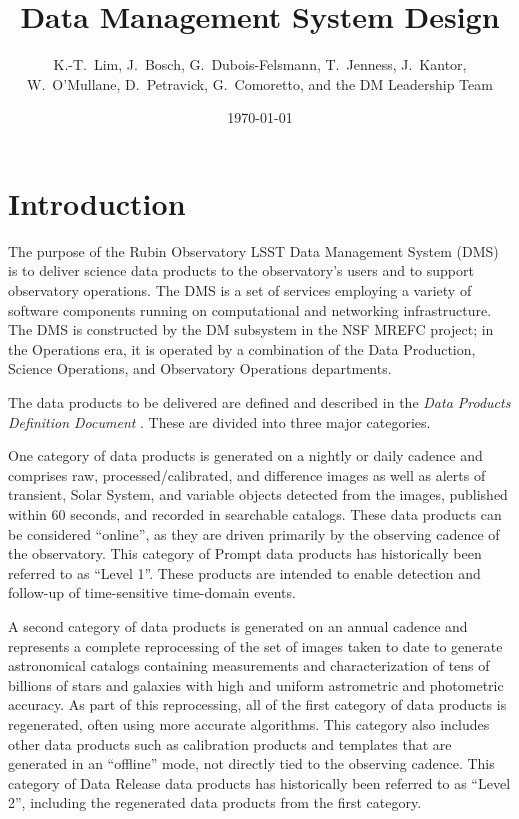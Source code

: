 \documentclass[DM,toc,lsstdraft]{lsstdoc}
\title{Data Management System Design}
\author{
  K.-T.~Lim,
  J.~Bosch,
  G.~Dubois-Felsmann,
  T.~Jenness,
  J.~Kantor,
  W.~O'Mullane,
  D.~Petravick,
  G.~Comoretto,
  and
  the DM Leadership Team}
\date{\today}
\begin{document}
\maketitle

\section{Introduction}\label{introduction}

The purpose of the Rubin Observatory LSST Data Management System (DMS) is to deliver science data
products to the observatory's users and to support observatory operations.  The
DMS is a set of services employing a variety of software components running on
computational and networking infrastructure.  The DMS is constructed by the DM
subsystem in the NSF MREFC project; in the Operations era, it is operated by a
combination of the Data Production, Science Operations, and Observatory
Operations departments.

The data products to be delivered are defined and described in the \textit{Data
Products Definition Document} . These are divided into three
major categories.

One category of data products is generated on a nightly or daily cadence
and comprises raw, processed/calibrated, and difference images as well as alerts
of transient, Solar System, and variable objects detected from the images,
published within 60 seconds, and recorded in searchable catalogs. These
data products can be considered ``online'', as they are driven primarily
by the observing cadence of the observatory. This category of Prompt data products has
historically been referred to as ``Level 1''.  These products are intended to
enable detection and follow-up of time-sensitive time-domain events.

A second category of data products is generated on an annual cadence and
represents a complete reprocessing of the set of images taken to date to
generate astronomical catalogs containing measurements and
characterization of tens of billions of stars and galaxies with high and
uniform astrometric and photometric accuracy. As part of this
reprocessing, all of the first category of data products is regenerated,
often using more accurate algorithms. This category also includes other
data products such as calibration products and templates that are
generated in an ``offline'' mode, not directly tied to the observing
cadence. This category of Data Release data products has historically been referred to as ``Level 2'',
including the regenerated data products from the first category.
\end{document}

